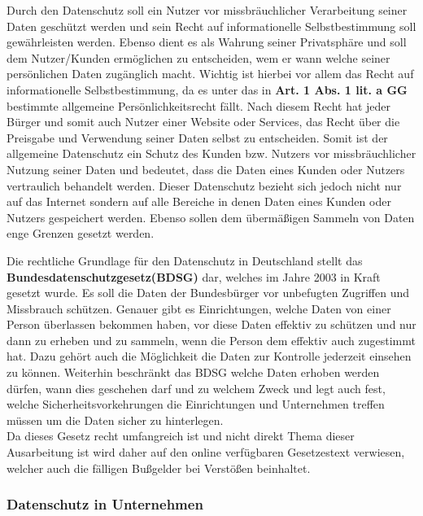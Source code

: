 \documentclass[a4paper, 12pt]{article}
\begin{document}
\noindent Durch den Datenschutz soll ein Nutzer vor missbräuchlicher Verarbeitung seiner Daten geschützt werden und sein Recht auf informationelle Selbstbestimmung soll gewährleisten werden. Ebenso dient es als Wahrung seiner Privatsphäre und soll dem Nutzer/Kunden ermöglichen zu entscheiden, wem er wann welche seiner persönlichen Daten zugänglich macht. Wichtig ist hierbei vor allem das Recht auf informationelle Selbstbestimmung, da es unter das in \textbf{Art. 1 Abs. 1 lit. a GG} bestimmte allgemeine Persönlichkeitsrecht fällt. Nach diesem Recht hat jeder Bürger und somit auch Nutzer einer Website oder Services, das Recht über die Preisgabe und Verwendung seiner Daten selbst zu entscheiden.
Somit ist der allgemeine Datenschutz ein Schutz des Kunden bzw. Nutzers vor missbräuchlicher Nutzung seiner Daten und bedeutet, dass die Daten eines Kunden oder Nutzers vertraulich behandelt werden. Dieser Datenschutz bezieht sich jedoch nicht nur auf das Internet sondern auf alle Bereiche in denen Daten eines Kunden oder Nutzers gespeichert werden. Ebenso sollen dem übermäßigen Sammeln von Daten enge Grenzen gesetzt werden.\\
\cite{wikiDatenschutz,datenschutz_internet}

\noindent Die rechtliche Grundlage für den Datenschutz in Deutschland stellt das \textbf{Bundesdatenschutzgesetz(BDSG)} dar, welches im Jahre 2003 in Kraft gesetzt wurde. Es soll die Daten der Bundesbürger vor unbefugten Zugriffen und Missbrauch schützen. Genauer gibt es Einrichtungen, welche Daten von einer Person überlassen bekommen haben, vor diese Daten effektiv zu schützen und nur dann zu erheben und zu sammeln, wenn die Person dem effektiv auch zugestimmt hat. Dazu gehört auch die Möglichkeit die Daten zur Kontrolle jederzeit einsehen zu können. Weiterhin beschränkt das BDSG welche Daten erhoben werden dürfen, wann dies geschehen darf und zu welchem Zweck und legt auch fest, welche Sicherheitsvorkehrungen die Einrichtungen und Unternehmen treffen müssen um die Daten sicher zu hinterlegen.\\Da dieses Gesetz recht umfangreich ist und nicht direkt Thema dieser Ausarbeitung ist wird daher auf den online verfügbaren Gesetzestext verwiesen, welcher auch die fälligen Bußgelder bei Verstößen beinhaltet.
\cite{Bundesdatenschutzgesetz}

\subsubsection{Datenschutz in Unternehmen}
\end{document}
